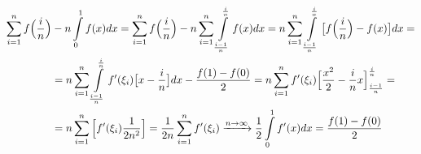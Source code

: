 \documentclass{article}[13pt]
\begin{document}
\begin{align*}
    \sum\limits_{i=1}^nf\Big(\frac in\Big)&-n\int\limits_0^1f(x)dx=\sum\limits_{i=1}^nf\Big(\frac in\Big)-n\sum\limits_{i=1}^n\int\limits_{{i-1\over n}}^\frac inf(x)dx=n\sum\limits_{i=1}^n\int\limits_{{i-1\over n}}^\frac in\big[f\Big(\frac in\Big)-f(x)\big]dx=\\
    &=n\sum\limits_{i=1}^n\int\limits_{{i-1\over n}}^\frac inf'(\xi_i)\big[x-\frac in\big]dx-{f(1)-f(0)\over2}=n\sum\limits_{i=1}^nf'(\xi_i)\Big[{x^2\over 2}-{i\over n}x\Big]_{{i-1\over n}}^\frac in=\\
    &=n\sum\limits_{i=1}^n\Big[f'(\xi_i){1\over2n^2}\Big]=\frac1{2n}\sum\limits_{i=1}^nf'(\xi_i)\xrightarrow{n\to\infty}\frac12\int\limits_0^1f'(x)dx={f(1)-f(0)\over 2}
\end{align*}
\medskip

\medskip
\end{document}
